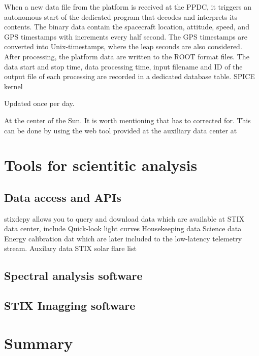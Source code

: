 \documentclass[referee]{aa} %
\begin{document}
When a new data file from the platform is received at the PPDC,
it triggers an autonomous start of the dedicated program that decodes and
interprets its contents. The binary data contain the spacecraft location, attitude, speed, and GPS timestamps with increments every half second. The GPS timestamps are converted into Unix-timestamps, where the leap seconds are also considered. After processing, the platform data are written to the ROOT format files. The data start and stop time, data processing time, input filename and ID of the output file of each processing are recorded in a dedicated database table.
SPICE kernel

Updated once per day.

At the center of the Sun.
It is worth mentioning that has to corrected for.
This can be done by using the web tool provided at the auxiliary data center at


\section{Tools for scientitic analysis }
\subsection{Data access and APIs}
stixdcpy allows you to query and download data which are available at STIX data center, include
Quick-look light curves
Housekeeping data
Science data
Energy calibration dat which are later included to the low-latency telemetry stream.
Auxilary data
STIX solar flare list
\subsection{Spectral analysis software}
\subsection{STIX Imagging software}



\section{Summary}
\label{sec:summary}



%
%



\end{document}
